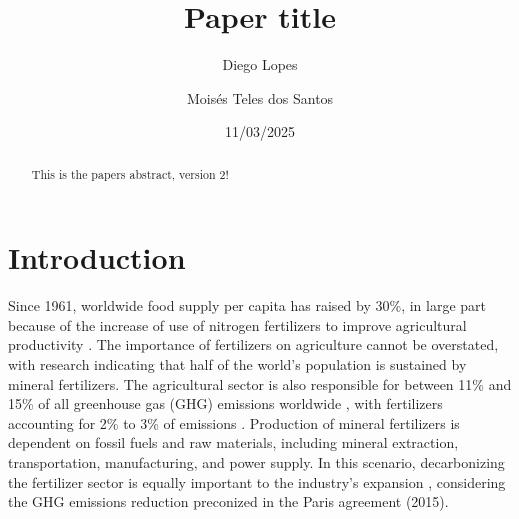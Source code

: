 \documentclass[a4paper, titlepage]{article}
\begin{document}
\title{Paper title}
\author{
	Diego Lopes\\
	\and
	Moisés Teles dos Santos}
\date{11/03/2025}
\maketitle

\begin{abstract}
	This is the papers abstract, version 2!
\end{abstract}

\section{Introduction}
Since 1961, worldwide food supply per capita has raised by 30\%, in large part because of the increase of use of
nitrogen fertilizers to improve agricultural productivity \cite{mbowIPCCSpecialReport2019}. The importance of
fertilizers on agriculture cannot be overstated, with research indicating that half of the world’s population
is sustained by mineral fertilizers. The agricultural sector is also responsible for between 11\% and 15\% of
all greenhouse gas (GHG) emissions worldwide \cite{ifaEstimatingReportingFertilizerRelated2016}, with fertilizers
accounting for 2\% to 3\% of emissions \cite{brentrupCarbonFootprintAnalysis2016}. Production of mineral fertilizers
is dependent on fossil fuels and raw materials, including mineral extraction,
transportation, manufacturing, and power supply. In this scenario, decarbonizing the fertilizer sector is equally
important to the industry’s expansion \cite{ouikhalfanNetZeroEmissionFertilizers2022}, considering the GHG emissions
reduction preconized in the Paris agreement (2015).





\printbibliography{}
\end{document}

